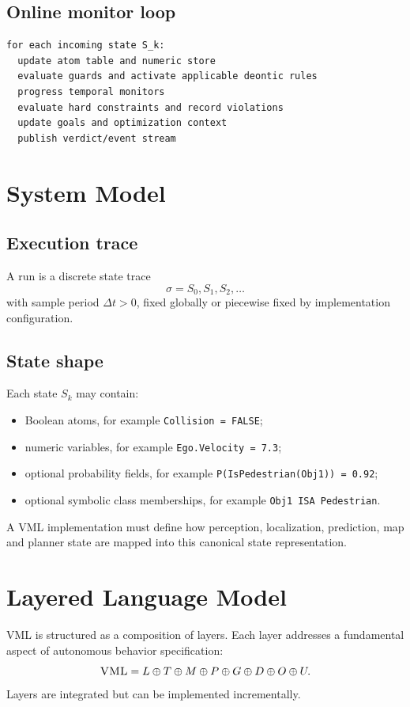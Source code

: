 \documentclass[11pt,a4paper]{article}
\newcommand{\VML}{\textsc{VML}}
\begin{document}
\subsection{Online monitor loop}
\begin{verbatim}
for each incoming state S_k:
  update atom table and numeric store
  evaluate guards and activate applicable deontic rules
  progress temporal monitors
  evaluate hard constraints and record violations
  update goals and optimization context
  publish verdict/event stream
\end{verbatim}

\section{System Model}
\subsection{Execution trace}
A run is a discrete state trace
\[
  \sigma = S_0, S_1, S_2, \ldots
\]
with sample period $\Delta t > 0$, fixed globally or piecewise fixed by implementation configuration.

\subsection{State shape}
Each state $S_k$ may contain:
\begin{itemize}
  \item Boolean atoms, for example \texttt{Collision = FALSE};
  \item numeric variables, for example \texttt{Ego.Velocity = 7.3};
  \item optional probability fields, for example \texttt{P(IsPedestrian(Obj1)) = 0.92};
  \item optional symbolic class memberships, for example \texttt{Obj1 ISA Pedestrian}.
\end{itemize}
A \VML{} implementation must define how perception, localization, prediction, map and planner state are mapped into this canonical state representation.

\section{Layered Language Model}
\VML{} is structured as a composition of layers. Each layer addresses a fundamental aspect of autonomous behavior specification:
\[
  \VML = L \oplus T \oplus M \oplus P \oplus G \oplus D \oplus O \oplus U.
\]
Layers are integrated but can be implemented incrementally.
\end{document}
